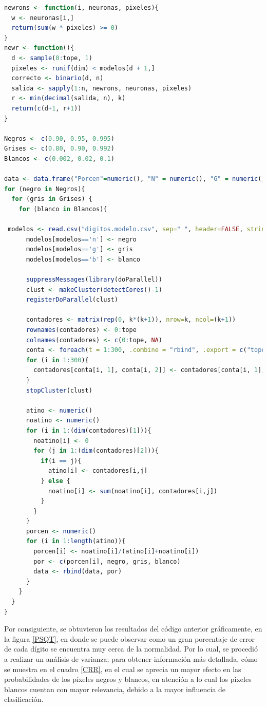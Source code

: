 \documentclass[12pt, letterpaper] {article}
\begin{document}
\begin{lstlisting}[language=R]
newrons <- function(i, neuronas, pixeles){
  w <- neuronas[i,]
  return(sum(w * pixeles) >= 0)
} 
newr <- function(){
  d <- sample(0:tope, 1)
  pixeles <- runif(dim) < modelos[d + 1,]
  correcto <- binario(d, n)
  salida <- sapply(1:n, newrons, neuronas, pixeles)
  r <- min(decimal(salida, n), k) 
  return(c(d+1, r+1))
}

Negros <- c(0.90, 0.95, 0.995)
Grises <- c(0.80, 0.90, 0.992)
Blancos <- c(0.002, 0.02, 0.1)

data <- data.frame("Porcen"=numeric(), "N" = numeric(), "G" = numeric(), "B"= numeric())
for (negro in Negros){
  for (gris in Grises) {
    for (blanco in Blancos){
      
 modelos <- read.csv("digitos.modelo.csv", sep=" ", header=FALSE, stringsAsFactors=F)
      modelos[modelos=='n'] <- negro
      modelos[modelos=='g'] <- gris
      modelos[modelos=='b'] <- blanco

      suppressMessages(library(doParallel))
      clust <- makeCluster(detectCores()-1)
      registerDoParallel(clust)
      
      contadores <- matrix(rep(0, k*(k+1)), nrow=k, ncol=(k+1))
      rownames(contadores) <- 0:tope
      colnames(contadores) <- c(0:tope, NA)
      conta <- foreach(t = 1:300, .combine = "rbind", .export = c("tope", "dim", "modelos", "neuronas", "pixeles")) %dopar% newr()
      for (i in 1:300){
        contadores[conta[i, 1], conta[i, 2]] <- contadores[conta[i, 1], conta[i, 2]] + 1
      }
      stopCluster(clust)

      atino <- numeric()
      noatino <- numeric()
      for (i in 1:(dim(contadores)[1])){
        noatino[i] <- 0
        for (j in 1:(dim(contadores)[2])){
          if(i == j){
            atino[i] <- contadores[i,j]
          } else {
            noatino[i] <- sum(noatino[i], contadores[i,j])
          }
        }
      }
      porcen <- numeric()
      for (i in 1:length(atino)){
        porcen[i] <- noatino[i]/(atino[i]+noatino[i])
        por <- c(porcen[i], negro, gris, blanco)
        data <- rbind(data, por)
      }
    }
  }
}
\end{lstlisting}

Por consiguiente, se obtuvieron los resultados del código anterior gráficamente, en la figura \ref{PSQT}, en donde se puede observar como un gran porcentaje de error de cada dígito se encuentra muy cerca de la normalidad. Por lo cual, se procedió a realizar un análisis de varianza; para obtener información más detallada, cómo se muestra en el cuadro \ref{CRR}, en el cual se aprecia un mayor efecto en las probabilidades de los píxeles negros y blancos, en atención a lo cual los pixeles blancos cuentan con mayor relevancia, debido a la mayor influencia de clasificación. 
\end{document}
